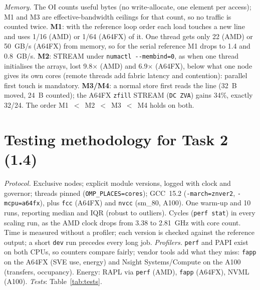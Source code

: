 \documentclass[conference,10pt]{IEEEtran}
\begin{document}
\emph{Memory.} The OI counts useful bytes (no write-allocate, one element per access); M1 and M3
are effective-bandwidth ceilings for that count, so no traffic is counted twice. \textbf{M1}: with the reference loop order each load touches a new line and uses
1/16 (AMD) or 1/64 (A64FX) of it. One thread gets only 22 (AMD) or 50~GB/s (A64FX) from memory, so for the serial reference M1
drops to 1.4 and 0.8~GB/s. \textbf{M2}: STREAM under \texttt{numactl -{}-membind=0}, as when one
thread initialises the arrays, lost 9.8$\times$ (AMD) and 6.9$\times$ (A64FX), below what one node gives its own cores (remote
threads add fabric latency and contention): parallel first touch is mandatory. \textbf{M3/M4}: a normal store first reads the line (32~B moved, 24~B counted);
the A64FX \texttt{zfill} STREAM (\texttt{DC ZVA}) gains 34\%, exactly 32/24. The order M1~$<$~M2~$<$~M3~$<$~M4 holds on both.

\section{Testing methodology for Task 2 (1.4)}
\emph{Protocol.} Exclusive nodes; explicit module versions, logged with clock and governor;
 threads pinned (\texttt{OMP\_PLACES=cores}); GCC~15.2 (\texttt{-march=znver2}, \texttt{-mcpu=a64fx}), plus \texttt{fcc} (A64FX) and
\texttt{nvcc} (sm\_80, A100). One warm-up and 10 runs, reporting median and IQR (robust to
outliers). Cycles (\texttt{perf stat}) in every scaling run, as the AMD
clock drops from 3.38 to 2.81~GHz with core count. Time is measured without a profiler; each version
is checked against the reference output; a short \texttt{dev} run precedes every long job.
\emph{Profilers.} \texttt{perf} and PAPI exist on both CPUs, so counters compare fairly;
vendor tools add what they miss: \texttt{fapp} on the A64FX (SVE use, energy) and Nsight
Systems/Compute on the A100 (transfers, occupancy). Energy: RAPL via \texttt{perf} (AMD),
\texttt{fapp} (A64FX), NVML (A100). \emph{Tests}: Table~\ref{tab:tests}.
\end{document}
